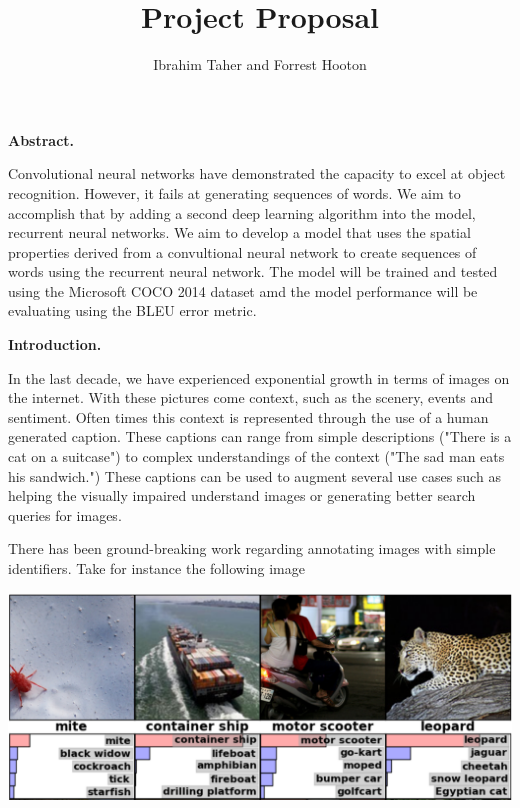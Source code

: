 \documentclass[11pt, oneside]{article}   	%
\title{Project Proposal}
\author{Ibrahim Taher and Forrest Hooton}
\begin{document}
\maketitle

\textbf{Abstract.}

Convolutional neural networks have demonstrated the capacity to excel at object recognition. However, it fails at generating sequences of words. We aim to accomplish that by adding a second deep learning algorithm into the model, recurrent neural networks. We aim to develop a model that uses the spatial properties derived from a convultional neural network to create sequences of words using the recurrent neural network. The model will be trained and tested using the Microsoft COCO 2014 dataset amd the model performance will be evaluating using the BLEU error metric.

\vspace{5mm}
\textbf{Introduction.}

In the last decade, we have experienced exponential growth in terms of images on the internet. With these pictures come context, such as the scenery, events and sentiment. Often times this context is represented through the use of a human generated caption. These captions can range from simple descriptions ("There is a cat on a suitcase") to complex understandings of the context ("The sad man eats his sandwich.") These captions can be used to augment several use cases such as helping the visually impaired understand images or generating better search queries for images.

There has been ground-breaking work regarding annotating images with simple identifiers. Take for instance the following image

\vspace{5mm}
\begin{center}
\includegraphics[scale=0.19]{figures/AlexClassification.png}
\end{center} 
 
\end{document}
